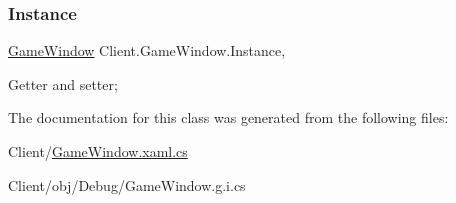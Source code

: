 \subsubsection{\texorpdfstring{Instance}{Instance}}
{\footnotesize\ttfamily \hyperlink{class_client_1_1_game_window}{Game\+Window} Client.\+Game\+Window.\+Instance\hspace{0.3cm}{\ttfamily [static]}, {\ttfamily [get]}}

Getter and setter; 

The documentation for this class was generated from the following files\+:\begin{DoxyCompactItemize}
\item 
Client/\hyperlink{_game_window_8xaml_8cs}{Game\+Window.\+xaml.\+cs}\item 
Client/obj/\+Debug/Game\+Window.\+g.\+i.\+cs\end{DoxyCompactItemize}
